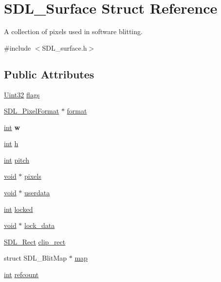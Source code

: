 \hypertarget{struct_s_d_l___surface}{}\section{S\+D\+L\+\_\+\+Surface Struct Reference}
\label{struct_s_d_l___surface}


A collection of pixels used in software blitting.  




{\ttfamily \#include $<$S\+D\+L\+\_\+surface.\+h$>$}

\subsection*{Public Attributes}
\begin{DoxyCompactItemize}
\item 
\hyperlink{_s_d_l__stdinc_8h_add440eff171ea5f55cb00c4a9ab8672d}{Uint32} \hyperlink{struct_s_d_l___surface_a86d78b665d5dfd7aa1dd9696b067641b}{flags}
\item 
\hyperlink{struct_s_d_l___pixel_format}{S\+D\+L\+\_\+\+Pixel\+Format} $\ast$ \hyperlink{struct_s_d_l___surface_a0a90721f947c10c3b79e02ccb419ca62}{format}
\item 
\hypertarget{struct_s_d_l___surface_a9b0ec7185dcdb2a3530a9160a6ea83d9}{}\hyperlink{_s_d_l__thread_8h_a6a64f9be4433e4de6e2f2f548cf3c08e}{int} {\bfseries w}\label{struct_s_d_l___surface_a9b0ec7185dcdb2a3530a9160a6ea83d9}

\item 
\hyperlink{_s_d_l__thread_8h_a6a64f9be4433e4de6e2f2f548cf3c08e}{int} \hyperlink{struct_s_d_l___surface_af33bcf87a1f5e10a99b3c7e8626b38c8}{h}
\item 
\hyperlink{_s_d_l__thread_8h_a6a64f9be4433e4de6e2f2f548cf3c08e}{int} \hyperlink{struct_s_d_l___surface_a5fa37325d77d65b2ed64ffc7cd01bb6c}{pitch}
\item 
\hyperlink{_s_d_l__audio_8h_a52835ae37c4bb905b903cbaf5d04b05f}{void} $\ast$ \hyperlink{struct_s_d_l___surface_abd9597e0e084b8ef33fe0397bc26d911}{pixels}
\item 
\hyperlink{_s_d_l__audio_8h_a52835ae37c4bb905b903cbaf5d04b05f}{void} $\ast$ \hyperlink{struct_s_d_l___surface_ae66d973dcb9b57cb34815892e1ee1f31}{userdata}
\item 
\hyperlink{_s_d_l__thread_8h_a6a64f9be4433e4de6e2f2f548cf3c08e}{int} \hyperlink{struct_s_d_l___surface_a5022edaeea1c0a055fa5d6dccba41de2}{locked}
\item 
\hyperlink{_s_d_l__audio_8h_a52835ae37c4bb905b903cbaf5d04b05f}{void} $\ast$ \hyperlink{struct_s_d_l___surface_a0afacfb933b54a9af0846a307a6924fb}{lock\+\_\+data}
\item 
\hyperlink{struct_s_d_l___rect}{S\+D\+L\+\_\+\+Rect} \hyperlink{struct_s_d_l___surface_aa9a0da3b38261dad6cf0cc4e3bb5b0c3}{clip\+\_\+rect}
\item 
struct S\+D\+L\+\_\+\+Blit\+Map $\ast$ \hyperlink{struct_s_d_l___surface_a8c1ecad399b0d4f525b1a53b6ee9393f}{map}
\item 
\hyperlink{_s_d_l__thread_8h_a6a64f9be4433e4de6e2f2f548cf3c08e}{int} \hyperlink{struct_s_d_l___surface_a03d10628a359c0674f5ceffd574f1641}{refcount}
\end{DoxyCompactItemize}


